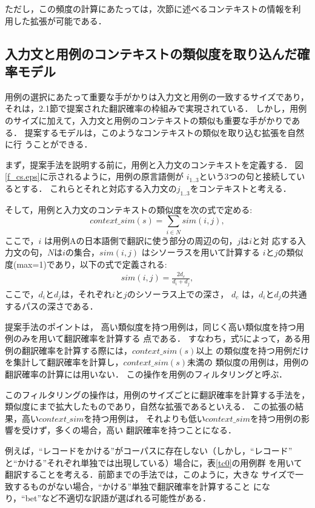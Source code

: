 ただし，この頻度の計算にあたっては，次節に述べるコンテキストの情報を利
用した拡張が可能である．
\clearpage

\subsection{入力文と用例のコンテキストの類似度を取り込んだ確率モデル}



用例の選択にあたって重要な手がかりは入力文と用例の一致するサイズであり，
それは，2.1節で提案された翻訳確率の枠組みで実現されている．
しかし，用例のサイズに加えて，入力文と用例のコンテキストの類似も重要な手がかりである．
提案するモデルは，このようなコンテキストの類似を取り込む拡張を自然に行
うことができる．

まず，提案手法を説明する前に，用例と入力文のコンテキストを定義する．
図\ref{f_cs.eps}に示されるように，用例の原言語側が
$i_{1..3}$という3つの句と接続しているとする．
これらとそれと対応する入力文の$j_{1..3}$をコンテキストと考える．

そして，用例と入力文のコンテキストの類似度を次の式で定める:
\begin{equation}
context\_sim(s) = \sum_{ i \in N} sim (i,j),
\end{equation}
ここで，$i$ は用例Aの日本語側で翻訳に使う部分の周辺の句，$j$は$i$と対
応する入力文の句，$N$は$i$の集合，$sim(i,j)$ はシソーラス\cite{NTT}を用いて計算する
$i$と$j$の類似度(max=1)であり，以下の式で定義される: 
\begin{eqnarray}
 sim(i, j) = \frac{2d_c}{d_{i}+d_{j}},
\end{eqnarray}
ここで，$d_{i}$と$d_{j}$は，それぞれ$i$と$j$のシソーラス上での深さ，
$d_c$ は，$d_{i}$と$d_{j}$の共通するパスの深さである．



提案手法のポイントは，
高い類似度を持つ用例は，同じく高い類似度を持つ用例のみを用いて翻訳確率を計算する
点である．
すなわち，式5によって，ある用例の翻訳確率を計算する際には，$context\_sim(s)$以上
の類似度を持つ用例だけを集計して翻訳確率を計算し，$context\_sim(s)$未満の
類似度の用例は，用例の翻訳確率の計算には用いない．
この操作を用例のフィルタリングと呼ぶ．

このフィルタリングの操作は，用例のサイズごとに翻訳確率を計算する手法を，
類似度にまで拡大したものであり，自然な拡張であるといえる．
この拡張の結果，高い$context\_sim$を持つ用例は，
それよりも低い$context\_sim$を持つ用例の影響を受けず，多くの場合，高い
翻訳確率を持つことになる．

例えば，``レコードをかける''がコーパスに存在しない（しかし，``レコード''
と``かける''それぞれ単独では出現している）場合に，表\ref{tc0}の用例群
を用いて翻訳することを考える．前節までの手法では，このように，大きな
サイズで一致するものがない場合，``かける''単独で翻訳確率を計算すること
になり，``bet''など不適切な訳語が選ばれる可能性がある．

